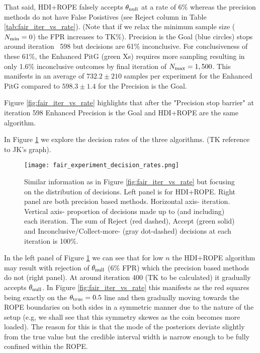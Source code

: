 That said, HDI+ROPE falsely accepts $\theta_{\rm null}$ at a rate of 6\% 
whereas the precision methods do not have False Posistives (see Reject column in Table \ref{tab:fair_iter_vs_rate}).
(Note that if we relax the minimum sample size ($N_{\rm min}=0$) the FPR increases to TK\%).
Precision is the Goal (blue circles) stops around iteration ~598 but decisions are 61\% inconclusive.
For conclusiveness of these 61\%, the Enhanced PitG (green Xs) requires more sampling 
resulting in only 1.6\% inconclusive outcomes by final iteration of $N_{\rm max}=1,500$.
This manifests in an average of $732.2\pm 210$ samples per experiment for the Enhanced PitG
compared to $598.3\pm 1.4$ for the Precision is the Goal.

Figure \ref{fig:fair_iter_vs_rate} highlights that after the "Precision stop barrier" at iteration 598 Enhanced Precision is the Goal and HDI+ROPE are the same algorithm.

In Figure \ref{fig:fair_decisions} we explore the decision rates of the three algorithms.
(TK reference to JK's graph).

\begin{figure}[h!]
  \centering
  \texttt{[image: fair\_experiment\_decision\_rates.png]}
  \caption{Similar information as in Figure \ref{fig:fair_iter_vs_rate} but focusing on the distribution of decisions. Left panel is for HDI+ROPE. Right panel are both precision based methods. Horizontal axis- iteration. Vertical axis- proportion of decisions made up to (and including) each iteration. The sum of Reject (red dashed), Accept (green solid) and Inconclusive/Collect-more- (gray dot-dashed) decisions at each iteration is 100\%.
  }
  \label{fig:fair_decisions}
\end{figure}

In the left panel of Figure \ref{fig:fair_decisions} we can see that for low $n$ the HDI+ROPE algorithm may result with rejection of
$\theta_{\rm null}$ ($6\%$ FPR) which the precision based methods do not (right panel). At around iteration 400 (TK to be calculated)
it gradually accepts $\theta_{\rm null}$. In Figure \ref{fig:fair_iter_vs_rate}
this manifests as the red squares being exactly on the $\theta_{\rm true}=0.5$ line
and then gradually moving towards the ROPE boundaries on both sides in a symmetric
manner due to the nature of the setup (e.g, we shall see that this symmetry
skewes as the coin becomes more loaded). The reason for this is that the mode of
the posteriors deviate slightly from the true value but the credible interval width
is narrow enough to be fully confined within the ROPE.

